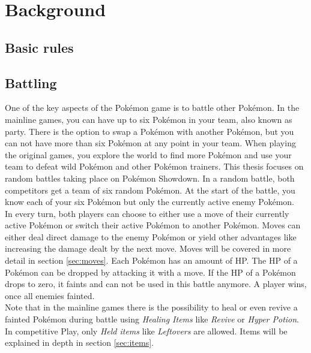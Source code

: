 \chapter{Background}

\section{Basic rules}
\section{Battling}
\label{sec:battling}
One of the key aspects of the Pokémon game is to battle other Pokémon. In the mainline games, you can 
have up to six Pokémon in your team, also known as party. There is the option to swap a Pokémon with
another Pokémon, but you can not have more than six Pokémon at any point in your team. When playing the 
original games, you explore the world to find more Pokémon and use your team to defeat wild Pokémon
and other Pokémon trainers. This thesis focuses on random battles taking place on Pokémon Showdown.
In a random battle, both competitors get a team of six random Pokémon. At the start of the battle,
you know each of your six Pokémon but only the currently active enemy Pokémon. \\
In every turn, both players can choose to either use a move of their currently active Pokémon or switch
their active Pokémon to another Pokémon. Moves can either deal direct damage to the enemy Pokémon or 
yield other advantages like increasing the damage dealt by the next move. Moves will be covered in more
detail in section \ref{sec:moves}. Each Pokémon has an amount of \ac{HP}. The \ac{HP} of a Pokémon
can be dropped by attacking it with a move. If the \ac{HP} of a Pokémon drops to zero, it faints and 
can not be used in this battle anymore. A player wins, once all enemies fainted. \\
Note that in the mainline games there is the possibility to heal or even revive a fainted 
Pokémon during battle using \textit{Healing Items} like \textit{Revive} or \textit{Hyper Potion}.
In competitive Play, only \textit{Held items} like \textit{Leftovers} are allowed. Items will be explained
in depth in section \ref{sec:items}.

